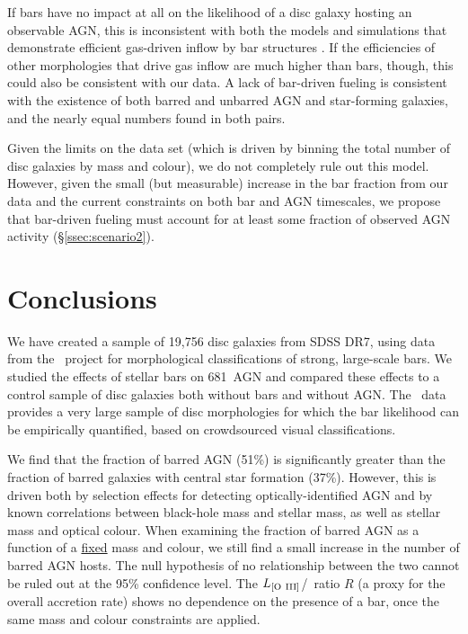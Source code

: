 If bars have no impact at all on the likelihood of a disc galaxy hosting an observable AGN, this is inconsistent with both the models and simulations that demonstrate efficient gas-driven inflow by bar structures \citep{HandQ10}. If the efficiencies of other morphologies that drive gas inflow are much higher than bars, though, this could also be consistent with our data. A lack of bar-driven fueling is consistent with the existence of both barred and unbarred AGN and star-forming galaxies, and the nearly equal numbers found in both pairs. 

Given the limits on the data set (which is driven by binning the total number of disc galaxies by mass and colour), we do not completely rule out this model. However, given the small (but measurable) increase in the bar fraction from our data and the current constraints on both bar and AGN timescales, we propose that bar-driven fueling must account for at least some fraction of observed AGN activity (\S\ref{ssec:scenario2}).
 
\section{Conclusions}
\label{sec:conclusions}
We have created a sample of 19,756 disc galaxies from SDSS DR7, using data from the \gztwo~project for morphological classifications of strong, large-scale bars. We studied the effects of stellar bars on 681~AGN and compared these effects to a control sample of disc galaxies both without bars and without AGN. The \gztwo~data provides a very large sample of disc morphologies for which the bar likelihood can be empirically quantified, based on crowdsourced visual classifications. 


We find that the fraction of barred AGN (51\%) is significantly greater than the fraction of barred galaxies with central star formation (37\%). However, this is driven both by selection effects for detecting optically-identified AGN and by known correlations between black-hole mass and stellar mass, as well as stellar mass and optical colour. When examining the fraction of barred AGN as a function of a \underline{fixed} mass and colour, we still find a small increase in the number of barred AGN hosts. The null hypothesis of no relationship between the two cannot be ruled out at the 95\% confidence level. The $L_{\rm{[O~III]}}$/\mbh~ratio $R$ (a proxy for the overall accretion rate) shows no dependence on the presence of a bar, once the same mass and colour constraints are applied.

